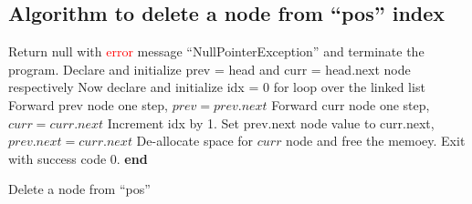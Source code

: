 \subsection{Algorithm to delete a node from \enquote{pos} index}
\begin{algorithm}
\DontPrintSemicolon
{}
\Begin
{
{
	Return null with \textcolor{red}{error} message \enquote{NullPointerException} and terminate the program.
}
Declare and initialize prev = head and curr = head.next node respectively\;
Now declare and initialize idx = 0 for loop over the linked list\;
{
	Forward prev node one step, $prev = prev.next$\;
	Forward curr node one step, $curr = curr.next$\;
	Increment idx by 1.
}
Set prev.next node value to curr.next, $prev.next = curr.next$\;
De-allocate space for $curr$ node and free the memoey.\;
Exit with success code 0.
}
\textbf{end}

\caption{Delete a node from \enquote{pos}}
\end{algorithm}